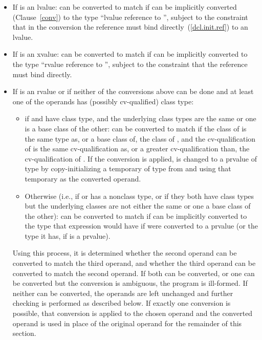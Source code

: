 \begin{itemize}
\item If  is an lvalue:  can be converted to match
 if  can be implicitly converted (Clause~\ref{conv})
to the type ``lvalue reference to '', subject to the
constraint that in the conversion the reference must bind
directly~(\ref{dcl.init.ref}) to an lvalue.

\item If  is an xvalue:  can be converted to match 
if  can be implicitly converted to the type ``rvalue reference to '',
subject to the constraint that the reference must bind directly.

\item If  is an rvalue or if neither of the conversions above can be
done and at least one of the operands has (possibly cv-qualified) class type:

\begin{itemize}
\item if  and  have class type, and the underlying
class types are the same or one is a base class of the other: 
can be converted to match  if the class of  is the
same type as, or a base class of, the class of , and the
cv-qualification of  is the same cv-qualification as, or a
greater cv-qualification than, the cv-qualification of . If
the conversion is applied,  is changed to a prvalue of type
 by copy-initializing a temporary of type  from
 and using that temporary as the converted operand.

\item Otherwise (i.e., if  or  has a nonclass type,
or if they both have class types but the underlying classes are not
either the same or one a base class of the other):  can be
converted to match  if  can be implicitly converted
to the type that expression  would have if  were
converted to a prvalue (or the type it has,
if  is a prvalue).
\end{itemize}

Using this process, it is determined whether the second operand can be
converted to match the third operand, and whether the third operand can
be converted to match the second operand. If both can be converted, or
one can be converted but the conversion is ambiguous, the program is
ill-formed. If neither can be converted, the operands are left unchanged
and further checking is performed as described below. If exactly one
conversion is possible, that conversion is applied to the chosen operand
and the converted operand is used in place of the original operand for
the remainder of this section.
\end{itemize}

